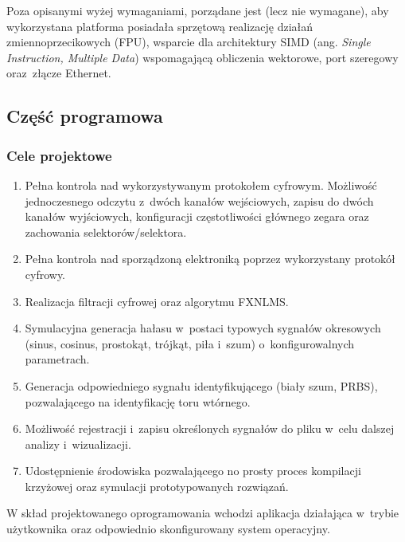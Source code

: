 Poza opisanymi wyżej wymaganiami, porządane jest (lecz nie wymagane), aby
wykorzystana platforma posiadała sprzętową realizację działań
zmiennoprzecikowych (FPU), wsparcie dla architektury SIMD (ang. \textit{Single
Instruction, Multiple Data}) wspomagającą obliczenia wektorowe, port szeregowy
oraz~złącze Ethernet.

\subsection{Część programowa}

\subsubsection{Cele projektowe}

\begin{enumerate}

    \item Pełna kontrola nad wykorzystywanym protokołem cyfrowym. Możliwość
    jednoczesnego odczytu z~dwóch kanałów wejściowych, zapisu do dwóch kanałów
    wyjściowych, konfiguracji częstotliwości głównego zegara oraz zachowania
    selektorów/selektora.

    \item Pełna kontrola nad sporządzoną elektroniką poprzez wykorzystany
    protokół cyfrowy.

    \item Realizacja filtracji cyfrowej oraz algorytmu FXNLMS.

    \item Symulacyjna generacja hałasu w~postaci typowych sygnałów okresowych
    (sinus, cosinus, prostokąt, trójkąt, piła i~szum) o~konfigurowalnych
    parametrach.

    \item Generacja odpowiedniego sygnału identyfikującego (biały szum, PRBS),
    pozwalającego na identyfikację toru wtórnego.

    \item Możliwość rejestracji i~zapisu określonych sygnałów do pliku w~celu
    dalszej analizy i~wizualizacji.

    \item Udostępnienie środowiska pozwalającego no prosty proces kompilacji
    krzyżowej oraz symulacji prototypowanych rozwiązań.

\end{enumerate}

W skład projektowanego oprogramowania wchodzi aplikacja działająca w~trybie
użytkownika oraz odpowiednio skonfigurowany system operacyjny.

